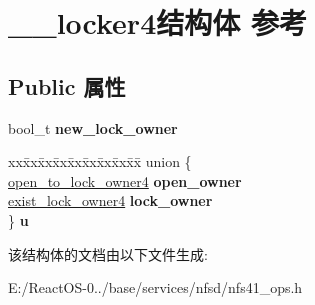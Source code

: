 \hypertarget{struct____locker4}{}\section{\+\_\+\+\_\+locker4结构体 参考}
\label{struct____locker4}
\subsection*{Public 属性}
\begin{DoxyCompactItemize}
\item 
\mbox{\label{struct____locker4_a76c8c29e140af44b3d8955bf181be42d}} 
bool\+\_\+t {\bfseries new\+\_\+lock\+\_\+owner}
\item 
\mbox{\label{struct____locker4_ae8011766378ca1c6c74431e28cbfbde3}} 
\begin{tabbing}
xx\=xx\=xx\=xx\=xx\=xx\=xx\=xx\=xx\=\kill
union \{\\
\>\hyperlink{struct____open__to__lock__owner4}{open\_to\_lock\_owner4} {\bfseries open\_owner}\\
\>\hyperlink{struct____exist__lock__owner4}{exist\_lock\_owner4} {\bfseries lock\_owner}\\
\} {\bfseries u}\\

\end{tabbing}\end{DoxyCompactItemize}


该结构体的文档由以下文件生成\+:\begin{DoxyCompactItemize}
\item 
E\+:/\+React\+O\+S-\/0../base/services/nfsd/nfs41\+\_\+ops.\+h\end{DoxyCompactItemize}
